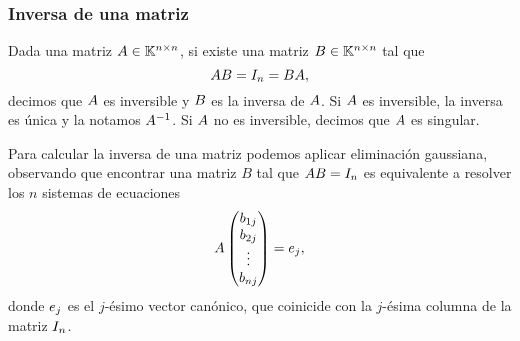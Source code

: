     \subsubsection{Inversa de una matriz}

Dada una matriz $\Ab \in \K^{n \times n}$, si existe una matriz $\Bb \in \K^{n\times n}$ tal que
$$
\Ab\Bb = \Id_n = \Bb\Ab,
$$
decimos que $\Ab$ es inversible y $\Bb$ es la inversa de $\Ab$. Si $\Ab$ es inversible, la inversa es única y la notamos $\Ab^{-1}$. Si $\Ab$ no es inversible, decimos que $\Ab$ es singular.

Para calcular la inversa de una matriz podemos aplicar eliminación gaussiana, observando que encontrar una matriz $B$ tal que $\Ab \Bb = \Id_n$ es equivalente a resolver los $n$ sistemas de ecuaciones
$$
\Ab \begin{pmatrix} b_{1j} \\ b_{2j} \\ \vdots \\ b_{nj} \end{pmatrix} = \eb_j,
$$
donde $\eb_j$ es el $j$-ésimo vector canónico, que coinicide con la $j$-ésima columna de la matriz $\Id_n$.

